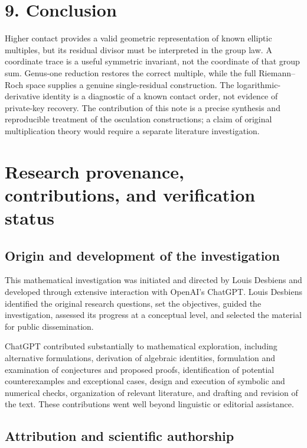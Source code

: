 \documentclass[
  11pt,
  a4paper,
]{article}
\begin{document}
\section{9. Conclusion}\label{conclusion}

Higher contact provides a valid geometric representation of known
elliptic multiples, but its residual divisor must be interpreted in the
group law. A coordinate trace is a useful symmetric invariant, not the
coordinate of that group sum. Genus-one reduction restores the correct
multiple, while the full Riemann--Roch space supplies a genuine
single-residual construction. The logarithmic-derivative identity is a
diagnostic of a known contact order, not evidence of private-key
recovery. The contribution of this note is a precise synthesis and
reproducible treatment of the osculation constructions; a claim of
original multiplication theory would require a separate literature
investigation.

\section{Research provenance, contributions, and verification
status}\label{research-provenance-contributions-and-verification-status}

\subsection{Origin and development of the
investigation}\label{origin-and-development-of-the-investigation}

This mathematical investigation was initiated and directed by Louis
Desbiens and developed through extensive interaction with OpenAI's
ChatGPT. Louis Desbiens identified the original research questions, set
the objectives, guided the investigation, assessed its progress at a
conceptual level, and selected the material for public dissemination.

ChatGPT contributed substantially to mathematical exploration, including
alternative formulations, derivation of algebraic identities,
formulation and examination of conjectures and proposed proofs,
identification of potential counterexamples and exceptional cases,
design and execution of symbolic and numerical checks, organization of
relevant literature, and drafting and revision of the text. These
contributions went well beyond linguistic or editorial assistance.

\subsection{Attribution and scientific
authorship}\label{attribution-and-scientific-authorship}
\end{document}

